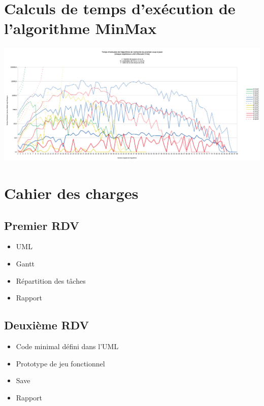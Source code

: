 \documentclass[11pt,a4paper]{article}
\begin{document}
\newpage
\section{Calculs de temps d'exécution de l'algorithme MinMax}

\begin{center}
\includegraphics[angle=270,origin=c,scale=0.4]{figures/minmax/Temps_Execution.png}
\label{fig:minMaxTempsExecution}
\end{center}


\newpage
\section{Cahier des charges}

\subsection{Premier RDV}

\begin{itemize}
    \item UML
    \item Gantt
    \item Répartition des tâches
    \item Rapport
\end{itemize}

\subsection{Deuxième RDV}

\begin{itemize}
    \item Code minimal défini dans l'UML
    \item Prototype de jeu fonctionnel
    \item Save
    \item Rapport
\end{itemize}
\end{document}
